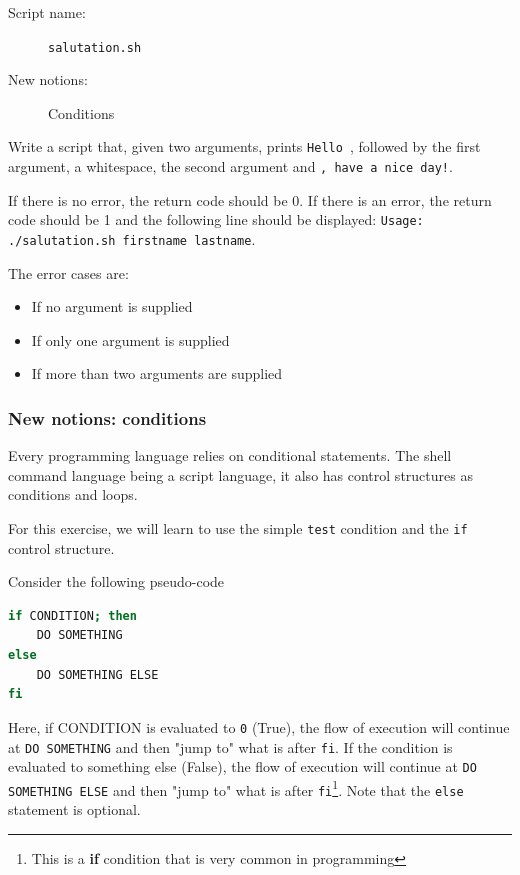 \documentclass[12pt]{article}
\begin{document}
\begin{description}
    \item[Script name:] \texttt{salutation.sh}
    \item[New notions:] Conditions
\end{description}

Write a script that, given two arguments, prints \texttt{Hello }, followed by the first argument, a whitespace, the second argument and \texttt{, have a nice day!}. 

If there is no error, the return code should be 0. If there is an error, the return code should be 1 and the following line should be displayed: \texttt{Usage: ./salutation.sh firstname lastname}.

The error cases are: 

\begin{itemize}
        \item If no argument is supplied
        \item If only one argument is supplied
        \item If more than two arguments are supplied
\end{itemize}

\subsubsection{New notions: conditions}

Every programming language relies on conditional statements. The shell command language being a script language, it also has control structures as conditions and loops.

For this exercise, we will learn to use the simple \texttt{test} condition and the \texttt{if} control structure.

Consider the following pseudo-code

\begin{lstlisting}[language=bash]
if CONDITION; then
	DO SOMETHING
else
	DO SOMETHING ELSE
fi
\end{lstlisting}

Here, if CONDITION is evaluated to \texttt{0} (True), the flow of execution will continue at \texttt{DO SOMETHING} and then "jump to" what is after \texttt{fi}. If the condition is evaluated to something else (False), the flow of execution will continue at \texttt{DO SOMETHING ELSE} and then "jump to" what is after \texttt{fi}\footnote{This is a \textbf{if} condition that is very common in programming}. Note that the \texttt{else} statement is optional.
\end{document}
